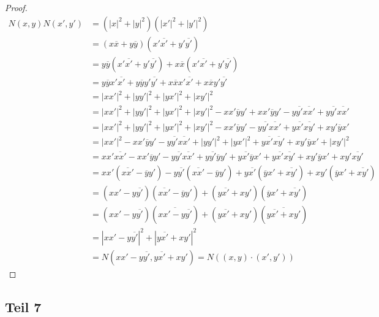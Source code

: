 \documentclass[10pt,a4paper]{article}
\begin{document}
\begin{proof}
\begin{align*}
N(x, y)N(x', y') & = (|x|^{2} + |y|^{2})(|x'|^{2} + |y'|^{2})\\
& = (x\overline{x} + y\overline{y})(x'\overline{x'} + y'\overline{y'})\\
& = y\overline{y}(x'\overline{x'} + y'\overline{y'}) + x\overline{x}(x'\overline{x'} + y'\overline{y'})\\
& = y\overline{y}x'\overline{x'} + y\overline{y}y'\overline{y'} + x\overline{x}x'\overline{x'} + x\overline{x}y'\overline{y'}\\
& = |xx'|^{2} + |yy'|^{2} + |yx'|^{2} + |xy'|^{2}\\
& = |xx'|^{2} + |yy'|^{2} + |yx'|^{2} + |xy'|^{2} - xx'\overline{y}y' + xx'\overline{y}y' - y\overline{y'}\overline{xx'} + y\overline{y'}\overline{xx'}\\
& = |xx'|^{2} + |yy'|^{2} + |yx'|^{2} + |xy'|^{2} - xx'\overline{y}y' - y\overline{y'}\overline{xx'} + y\overline{x'}\overline{xy'} + xy'\overline{y}x'\\
& = |xx'|^{2} - xx'\overline{y}y' - y\overline{y'}\overline{xx'} + |yy'|^{2} + |yx'|^{2} + y\overline{x'}\overline{xy'} + xy'\overline{y}x' + |xy'|^{2}\\
& = xx'\overline{xx'} - xx'\overline{y}y' - y\overline{y'}\overline{xx'} + y\overline{y'}\overline{y}y' + y\overline{x'}\overline{y}x' + y\overline{x'}\overline{xy'} + xy'\overline{y}x' + xy'\overline{xy'}\\
& = xx'(\overline{xx'} - \overline{y}y') - y\overline{y'}(\overline{xx'} - \overline{y}y') + y\overline{x'}(\overline{y}x' + \overline{xy'}) + xy'(\overline{y}x' + \overline{xy'})\\
& = (xx' - y\overline{y'})(\overline{xx'} - \overline{y}y') + (y\overline{x'} + xy')(\overline{y}x' + \overline{xy'})\\
& = (xx' - y\overline{y'})(\overline{xx' - y\overline{y'}}) + (y\overline{x'} + xy')(\overline{y\overline{x'} + xy'})\\
& = |xx' - y\overline{y'}|^{2} + |y\overline{x'} + xy'|^{2}\\
& = N(xx' - y\overline{y'}, y\overline{x'} + xy') = N((x, y) \cdot (x', y'))
\end{align*}
\end{proof}

\subsection*{Teil 7}
\end{document}
